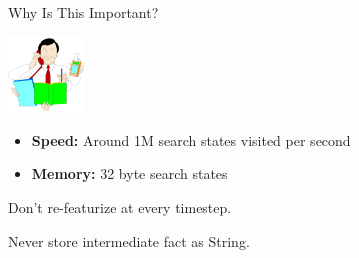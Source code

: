 \def\title{Why Is This Important?}
\begin{frame}{\title}
\begin{center}
\includegraphics[height=2cm]{../img/efficient.png}
\end{center}

\begin{itemize}
\item \textbf{Speed:} Around 1M search states visited per second
\item \textbf{Memory:} 32 byte search states
\end{itemize}
\vspace{2ex}
\pause

 Don't re-featurize at every timestep.
\vspace{2ex}
\pause

 Never store intermediate fact as String.
\end{frame}




\newcommand{\hnode}[1]{|(#1)| \w{#1}}
\newcommand{\rnode}[2]{|(#1#2)| \w{\textcolor{darkblue}{\textbf{#1}}}\textcolor{white}{#2}}
\newcommand{\bnode}[2]{|(#1#2)| \w{\textcolor{darkblue}{\textcolor{darkred}{\textbf{#1}}}}\textcolor{white}{#2}}

\def\title{An Example Search}

